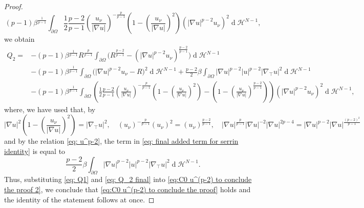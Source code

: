 \documentclass[10pt,a4paper, reqno]{amsart}
\numberwithin{equation}{section}
\renewcommand{\d}[1]{\ensuremath{\operatorname{d}\!{#1}}}
\begin{document}
\begin{proof}
    \begin{equation}\label{eq: final added term for serrin identity}
        (p-1) \beta^{\frac{1}{p-1}}  \int_{\partial\Omega}  \frac{1}{2} \frac{p-2}{p-1} \left(\frac{u_\nu}{|\nabla u|}\right)^{-\frac{p}{p-1}} \left(1- \left(\frac{u_\nu}{|\nabla u|}\right)^2 \right) (|\nabla u|^{p-2} u_\nu)^2 \d{}\mathcal{H}^{N-1},
    \end{equation}
    we obtain
    \begin{equation}\label{eq: Q_2 final}
    \begin{split}
        Q_2 =& - (p-1) \beta^{\frac{1}{p-1}} R^{\frac{p}{p-1}} \int_{\partial\Omega} \Big( R^{\frac{p-2}{p-1}} - (|\nabla u|^{p-2} u_\nu)^{\frac{p-2}{p-1}} \Big) \d{}\mathcal{H}^{N-1}
        \\
        & - (p-1) \beta^{\frac{1}{p-1}} \int_{\partial\Omega} \Big(|\nabla u|^{p-2} u_\nu - R \Big)^2  \d{}\mathcal{H}^{N-1} + \frac{p-2}{2}\beta \int_{\partial\Omega} |\nabla u|^{p-2}|u|^{p-2}|\nabla_\top u|^2 \d{}\mathcal{H}^{N-1}
        \\
        & - (p-1) \beta^{\frac{1}{p-1}}  \int_{\partial\Omega}  \left( \frac{1}{2} \frac{p-2}{p-1} \left(\frac{u_\nu}{|\nabla u|}\right)^{-\frac{p}{p-1}} \left(1- \left(\frac{u_\nu}{|\nabla u|}\right)^2 \right) - \left(1- \left(\frac{u_\nu}{|\nabla u|}\right)^{\frac{p-2}{p-1}} \right) \right) (|\nabla u|^{p-2} u_\nu)^2 \d{}\mathcal{H}^{N-1}, 
    \end{split}
    \end{equation}
    where, we have used that, by 
    \begin{equation*}
        |\nabla u|^2 \left(1- \left(\frac{u_\nu}{|\nabla u|}\right)^2 \right) = |\nabla_\top u|^2,\quad  (u_\nu)^{-\frac{p}{p-1}} (u_\nu)^2 = (u_\nu)^{\frac{p-2}{p-1}},\quad |\nabla u|^{\frac{p}{p-1}} |\nabla u|^{-2} |\nabla u|^{2p-4} = |\nabla u|^{p-2} |\nabla u|^{\frac{(p-2)^2}{p-1}}
    \end{equation*}
    and by the relation \eqref{eq: u^p-2}, the term in \eqref{eq: final added term for serrin identity} is equal to
    \begin{equation*}
        \frac{p-2}{2}\beta \int_{\partial\Omega} |\nabla u|^{p-2}|u|^{p-2}|\nabla_\top u|^2 \d{}\mathcal{H}^{N-1}.
    \end{equation*}
    Thus, substituting \eqref{eq: Q1} and \eqref{eq: Q_2 final} into \eqref{eq:C0 u^(p-2) to conclude the proof 2}, we conclude that \eqref{eq:C0 u^(p-2) to conclude the proof} holds and the identity of the statement follows at once.
    \end{proof}
\end{document}
